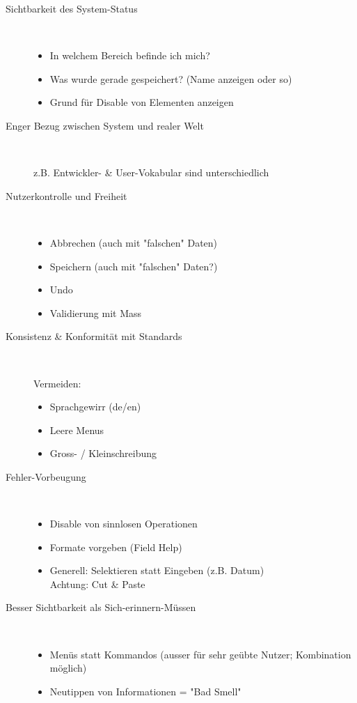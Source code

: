 \documentclass{report}
\begin{document}
\begin{description}
\item[Sichtbarkeit des System-Status]~\par
\begin{itemize}
\item In welchem Bereich befinde ich mich?
\item Was wurde gerade gespeichert? (Name anzeigen oder so)
\item Grund für Disable von Elementen anzeigen
\end{itemize}
\item[Enger Bezug zwischen System und realer Welt]~\par
z.B. Entwickler- \& User-Vokabular sind unterschiedlich
\item[Nutzerkontrolle und Freiheit]~\par
\begin{itemize}
\item Abbrechen (auch mit "falschen" Daten)
\item Speichern (auch mit "falschen" Daten?)
\item Undo
\item Validierung mit Mass
\end{itemize}

\item[Konsistenz \& Konformität mit Standards]~\par
Vermeiden:
\begin{itemize}
\item Sprachgewirr (de/en)
\item Leere Menus
\item Gross- / Kleinschreibung
\end{itemize}

\item[Fehler-Vorbeugung]~\par
\begin{itemize}
\item Disable von sinnlosen Operationen
\item Formate vorgeben (Field Help)
\item Generell: Selektieren statt Eingeben (z.B. Datum)\\
Achtung: Cut \& Paste
\end{itemize}

\item[Besser Sichtbarkeit als Sich-erinnern-Müssen]~\par
\begin{itemize}
\item Menüs statt Kommandos
(ausser für sehr geübte Nutzer; Kombination möglich)
\item Neutippen von Informationen = "Bad Smell"
\end{itemize}


\end{description}
\end{document}
